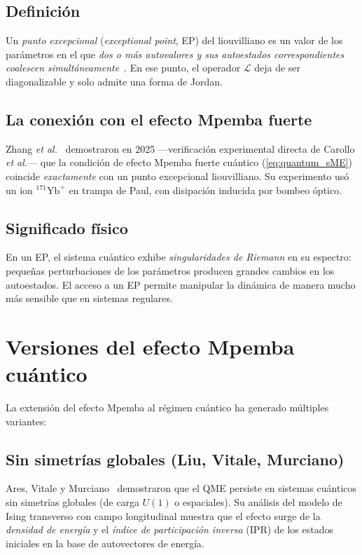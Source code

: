 \subsection{Definición}

Un \emph{punto excepcional} (\emph{exceptional point}, EP) del liouvilliano es 
un valor de los parámetros en el que \emph{dos o más autovalores y sus 
autoestados correspondientes coalescen simultáneamente}~\cite{minganti2019}. En 
ese punto, el operador $\mathcal{L}$ deja de ser diagonalizable y solo admite 
una forma de Jordan.

\subsection{La conexión con el efecto Mpemba fuerte}

Zhang \emph{et al.}~\cite{zhang2025} demostraron en 2025 ---verificación 
experimental directa de Carollo \emph{et al.}--- que la condición de efecto 
Mpemba fuerte cuántico (\cref{eq:quantum_sME}) coincide \emph{exactamente} con 
un punto excepcional liouvilliano. Su experimento usó un ion $^{171}\mathrm{Yb}^{+}$ 
en trampa de Paul, con disipación inducida por bombeo óptico.

\subsection{Significado físico}

En un EP, el sistema cuántico exhibe \emph{singularidades de Riemann} en su 
espectro: pequeñas perturbaciones de los parámetros producen grandes cambios en 
los autoestados. El acceso a un EP permite manipular la dinámica de manera 
mucho más sensible que en sistemas regulares.

\section{Versiones del efecto Mpemba cuántico}

La extensión del efecto Mpemba al régimen cuántico ha generado múltiples 
variantes:

\subsection{Sin simetrías globales (Liu, Vitale, Murciano)}

Ares, Vitale y Murciano~\cite{ares2025} demostraron que el QME persiste en 
sistemas cuánticos sin simetrías globales (de carga $U(1)$ o espaciales). Su 
análisis del modelo de Ising transverso con campo longitudinal muestra que el 
efecto surge de la \emph{densidad de energía} y el \emph{índice de participación 
inversa} (IPR) de los estados iniciales en la base de autovectores de energía.

